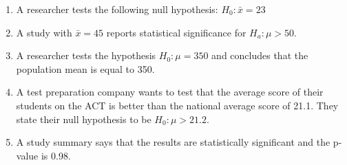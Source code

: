 \documentclass[10pt]{article}\usepackage[]{graphicx}\usepackage[]{color}
\begin{document}
\begin{enumerate}
  \itemsep0.5in
  \item A researcher tests the following null hypothesis: $H_0 : \bar{x} = 23$
  \item A study with $\bar{x} = 45$ reports statistical significance for $H_a : \mu > 50$. 
  \item A researcher tests the hypothesis $H_0 : \mu = 350$ and concludes that the population mean is equal to 350. 
  \item A test preparation company wants to test that the average score of their students on the ACT is better than the national average score of 21.1. They state their null hypothesis to be $H_0 : \mu > 21.2$. 
  \item A study summary says that the results are statistically significant and the p-value is 0.98. 
\end{enumerate}
% 
% 
% 
% 
% 
\end{document}

